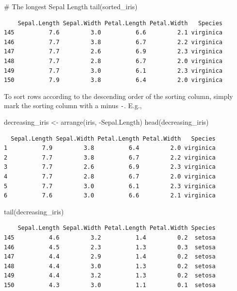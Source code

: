 \documentclass[
  letterpaper,
]{book}
\newenvironment{Shaded}{\begin{snugshade}}{\end{snugshade}}
\newcommand{\CommentTok}[1]{\textcolor[rgb]{0.37,0.37,0.37}{#1}}
\newcommand{\FunctionTok}[1]{\textcolor[rgb]{0.28,0.35,0.67}{#1}}
\newcommand{\NormalTok}[1]{\textcolor[rgb]{0.00,0.23,0.31}{#1}}
\newcommand{\OtherTok}[1]{\textcolor[rgb]{0.00,0.23,0.31}{#1}}
\newcommand{\SpecialCharTok}[1]{\textcolor[rgb]{0.37,0.37,0.37}{#1}}
\begin{document}
\begin{Shaded}
\begin{Highlighting}[]
\CommentTok{\# The longest Sepal Length}
\FunctionTok{tail}\NormalTok{(sorted\_iris)}
\end{Highlighting}
\end{Shaded}

\begin{verbatim}
    Sepal.Length Sepal.Width Petal.Length Petal.Width   Species
145          7.6         3.0          6.6         2.1 virginica
146          7.7         3.8          6.7         2.2 virginica
147          7.7         2.6          6.9         2.3 virginica
148          7.7         2.8          6.7         2.0 virginica
149          7.7         3.0          6.1         2.3 virginica
150          7.9         3.8          6.4         2.0 virginica
\end{verbatim}

To sort rows according to the descending order of the sorting column,
simply mark the sorting column with a minus \texttt{-}. E.g.,

\begin{Shaded}
\begin{Highlighting}[]
\NormalTok{decreasing\_iris }\OtherTok{\textless{}{-}} \FunctionTok{arrange}\NormalTok{(iris, }\SpecialCharTok{{-}}\NormalTok{Sepal.Length)}
\FunctionTok{head}\NormalTok{(decreasing\_iris)}
\end{Highlighting}
\end{Shaded}

\begin{verbatim}
  Sepal.Length Sepal.Width Petal.Length Petal.Width   Species
1          7.9         3.8          6.4         2.0 virginica
2          7.7         3.8          6.7         2.2 virginica
3          7.7         2.6          6.9         2.3 virginica
4          7.7         2.8          6.7         2.0 virginica
5          7.7         3.0          6.1         2.3 virginica
6          7.6         3.0          6.6         2.1 virginica
\end{verbatim}

\begin{Shaded}
\begin{Highlighting}[]
\FunctionTok{tail}\NormalTok{(decreasing\_iris)}
\end{Highlighting}
\end{Shaded}

\begin{verbatim}
    Sepal.Length Sepal.Width Petal.Length Petal.Width Species
145          4.6         3.2          1.4         0.2  setosa
146          4.5         2.3          1.3         0.3  setosa
147          4.4         2.9          1.4         0.2  setosa
148          4.4         3.0          1.3         0.2  setosa
149          4.4         3.2          1.3         0.2  setosa
150          4.3         3.0          1.1         0.1  setosa
\end{verbatim}
\end{document}

